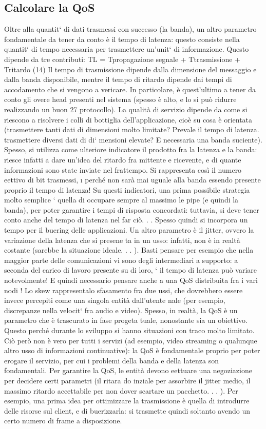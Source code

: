 \subsection{Calcolare la QoS}
Oltre alla quantit` di dati trasmessi con successo (la banda), un altro parametro
fondamentale da tener da conto è il tempo di latenza: questo consiste nella
quantit` di tempo necessaria per trasmettere un'unit` di informazione. Questo
dipende da tre contributi:
TL = Tpropagazione segnale + Ttrasmissione + Tritardo
(14)
Il tempo di trasmissione dipende dalla dimensione del messaggio e dalla banda
disponibile, mentre il tempo di ritardo dipende dai tempi di accodamento che
si vengono a vericare. In particolare, è quest'ultimo a tener da conto gli overe
head presenti nel sistema (spesso è alto, e lo si può ridurre realizzando un buon
27
protocollo).
La qualità di servizio dipende da come si riescono a risolvere i colli di bottiglia
dell'applicazione, cioè su cosa è orientata (trasmettere tanti dati di dimensioni
molto limitate? Prevale il tempo di latenza. trasmettere diversi dati di di`
mensioni elevate? E necessaria una banda suciente). Spesso, si utilizza come
ulteriore indicatore il prodotto fra la latenza e la banda: riesce infatti a dare
un'idea del ritardo fra mittente e ricevente, e di quante informazioni sono state
inviate nel frattempo. Si rappresenta così il numero eettivo di bit trasmessi,
\i{}
perché non sarà mai uguale alla banda essendo presente proprio il tempo di
latenza! Su questi indicatori, una prima possibile strategia molto semplice `
quella di occupare sempre al massimo le pipe (e quindi la banda), per poter
garantire i tempi di risposta concordati: tuttavia, si deve tener conto anche
del tempo di latenza nel far ciò. . . Spesso quindi si incorpora un tempo per il
buering delle applicazioni.
Un altro parametro è il jitter, ovvero la variazione della latenza che si presene
ta in un usso: infatti, non è in realtà costante (sarebbe la situazione ideale. . . ).
Basti pensare per esempio che nella maggior parte delle comunicazioni vi sono
degli intermediari a supporto: a seconda del carico di lavoro presente su di loro,
`
il tempo di latenza può variare notevolmente! E quindi necessario pensare anche
a una QoS distribuita fra i vari nodi !
Lo skew rappresentalo sfasamento fra due ussi, che dovrebbero essere invece
percepiti come una singola entità dall'utente nale (per esempio, discrepanze
nella velocit` fra audio e video).
Spesso, in realtà, la QoS è un parametro che è trascurato in fase progeta
tuale, nonostante sia un obiettivo. Questo perché durante lo sviluppo si hanno
situazioni con traco molto limitato. Ciò però non è vero per tutti i servizi
(ad esempio, video streaming o qualunque altro usso di informazioni continuative): la QoS è fondamentale proprio per
poter erogare il servizio, per cui i
problemi della banda e della latenza son fondamentali. Per garantire la QoS, le
entità devono eettuare una negoziazione per decidere certi parametri (il ritara
do inziale per assorbire il jitter medio, il massimo ritardo accettabile per non
dover scartare un pacchetto. . . ). Per esempio, una prima idea per ottimizzare
la trasmissione è quella di introdurre delle risorse sul client, e di buerizzarla:
si trasmette quindi soltanto avendo un certo numero di frame a disposizione.
